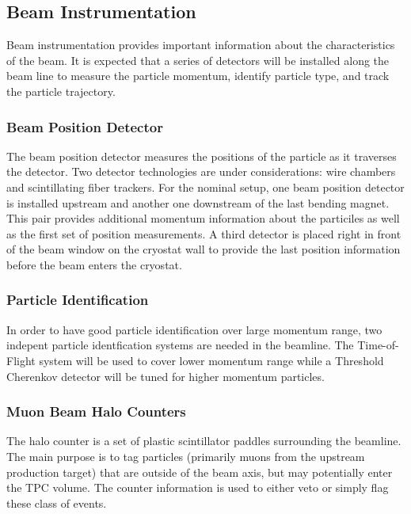 
\subsection{Beam Instrumentation}
Beam instrumentation provides important information about the characteristics of the beam. It is expected that a series of detectors will be installed along the beam line to measure the particle momentum, identify particle type, and track the particle trajectory.

\subsubsection{Beam Position Detector}
The beam position detector measures the positions of the particle as it traverses the detector. Two detector technologies are under considerations: wire chambers and scintillating fiber trackers. For the nominal setup, one beam position detector is installed upstream and another one downstream of the last bending magnet. This pair provides additional momentum information about the particiles as well as the first set of position measurements. A third detector is placed right in front of the beam window on the cryostat wall to provide the last position information before the beam enters the cryostat.

\subsubsection{Particle Identification}
In order to have good particle identification over large momentum range, two indepent particle identfication systems are needed in the beamline. The Time-of-Flight system will be used to cover lower momentum range while a Threshold Cherenkov detector will be tuned for higher momentum particles.

\subsubsection{Muon Beam Halo Counters}
The halo counter is a set of plastic scintillator paddles surrounding the beamline. The main purpose is to tag particles (primarily muons from the upstream production target) that are outside of the beam axis, but may potentially enter the TPC volume. The counter information is used to either veto or simply flag these class of events.

